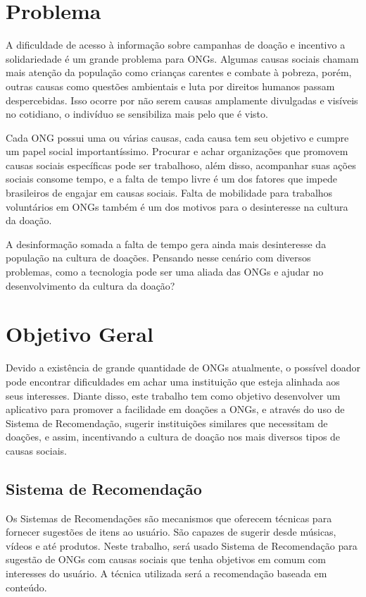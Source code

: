\documentclass[conference]{IEEEtran}
\begin{document}
\section{Problema}
A dificuldade de acesso à informação sobre campanhas de doação e incentivo a solidariedade é um grande problema para ONGs. Algumas causas sociais chamam mais atenção da população como crianças carentes e combate à pobreza, porém, outras causas como questões ambientais e luta por direitos humanos passam despercebidas. Isso ocorre por não serem causas amplamente divulgadas e visíveis no cotidiano, o indivíduo se sensibiliza mais pelo que é visto. 

Cada ONG possui uma ou várias causas, cada causa tem seu objetivo e cumpre um papel social importantíssimo. Procurar e achar organizações que promovem causas sociais específicas pode ser trabalhoso, além disso, acompanhar suas ações sociais consome tempo, e a falta de tempo livre é um dos fatores que impede brasileiros de engajar em causas sociais. Falta de mobilidade para trabalhos voluntários em ONGs também é um dos motivos para o desinteresse na cultura da doação. \cite{goff2020identifying}

A desinformação somada a falta de tempo gera ainda mais desinteresse da população na cultura de doações. Pensando nesse cenário com diversos problemas, como a tecnologia pode ser uma aliada das ONGs e ajudar no desenvolvimento da cultura da doação?





\section{Objetivo Geral}
Devido a existência de grande quantidade de ONGs atualmente, o possível doador pode encontrar dificuldades em achar uma instituição que esteja alinhada aos seus interesses. Diante disso, este trabalho tem como objetivo desenvolver um aplicativo para promover a facilidade em doações a ONGs, e através do uso de Sistema de Recomendação, sugerir instituições similares que necessitam de doações, e assim, incentivando a cultura de doação nos mais diversos tipos de causas sociais.

\subsection{Sistema de Recomendação}
Os Sistemas de Recomendações são mecanismos que oferecem técnicas para fornecer sugestões de itens ao usuário. São capazes de sugerir desde músicas, vídeos e até produtos. Neste trabalho, será usado Sistema de Recomendação para sugestão de ONGs com causas sociais que tenha objetivos em comum com interesses do usuário. A técnica utilizada será a recomendação baseada em conteúdo. 
\end{document}
